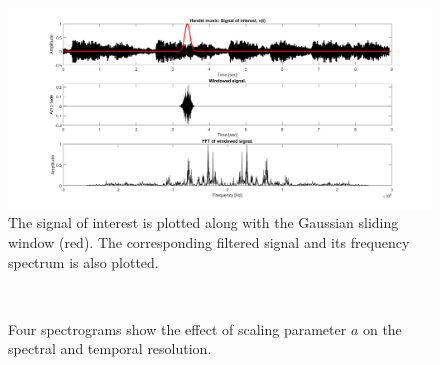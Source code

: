 \documentclass{article}
\begin{document}
\begin{figure}[!t]
  \centering
    \includegraphics[scale=0.35]{./Figures/signal.png}
    \caption{The signal of interest is plotted along with the Gaussian sliding window (red). The corresponding filtered signal and its frequency spectrum is also plotted.}
  \label{fig:signal}
\end{figure}

\begin{figure}[!t]
\\
\caption{Four spectrograms show the effect of scaling parameter $a$ on the spectral and temporal resolution. }
\label{fig:scaling}
\end{figure}
\end{document}
